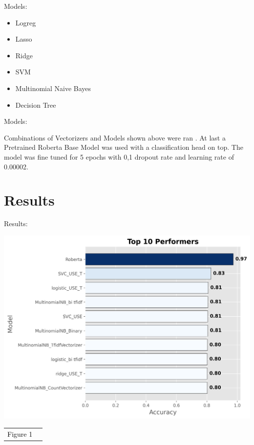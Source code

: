 \documentclass[12pt]{beamer}
\begin{document}
\begin{frame}{Models:}
\begin{itemize}
\item Logreg
\item Lasso
\item Ridge
\item SVM
\item Multinomial Naive Bayes
\item Decision Tree


\end{itemize}

\end{frame}

\begin{frame}{Models:}

Combinations of Vectorizers and Models shown above were ran .
At last a Pretrained Roberta Base Model was used with a classification head on top. 
The model was fine tuned for 5 epochs with 0,1 dropout rate and learning rate of 0.00002.
  




\end{frame}

\section{Results}
\begin{frame}{Results:}
\begin{center}
    \includegraphics[width=0.7\linewidth]{top10_performers_blue.png}
    
    \vspace{1em}
    \begin{tabular}{ll}
      \textcolor{black}{ Figure 1 }\\

    \end{tabular}
\end{center}
\end{frame}
\end{document}
